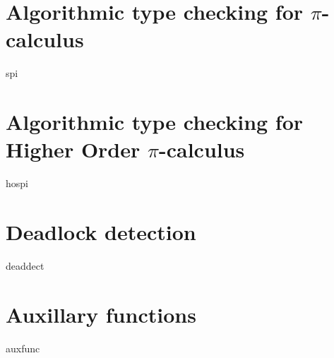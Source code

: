 \section{Algorithmic type checking for \texorpdfstring{$\pi$}{pi}-calculus}
\label{algotypepi}
{spi}

\section{Algorithmic type checking for Higher Order \texorpdfstring{$\pi$}{pi}-calculus}
\label{algotypehopi}
{hospi}

\section{Deadlock detection}
\label{deadlocktheory}
{deaddect}

\section{Auxillary functions}
\label{auxfunc}
{auxfunc}